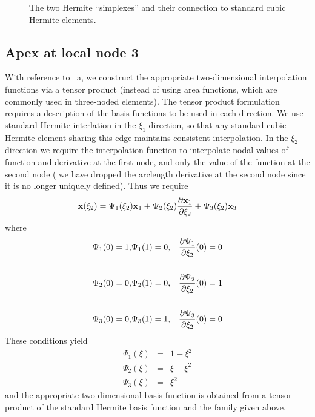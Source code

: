 \begin{figure}
\centering
 
 \caption[The two Hermite ``simplexes'']{The two Hermite ``simplexes'' and their connection to standard cubic Hermite 
elements.}
\label{fig:hermitesectors}
\end{figure}

\subsection{Apex at local node 3}
With reference to ~a, we construct the appropriate
two-dimensional interpolation functions via a tensor product (instead of using
area functions, which are commonly used in three-noded elements).  The tensor
product formulation requires a description of the basis functions to be used
in each direction.  We use standard Hermite interlation in the $\xi_{1}$
direction, so that any standard cubic Hermite element sharing this edge
maintains consistent interpolation.  In the $\xi_{2}$ direction we require the
interpolation function to interpolate nodal values of function and derivative
at the first node, and only the value of the function at the second node (\ie
we have dropped the arclength derivative at the second node since it is no
longer uniquely defined).  Thus we require
\begin{displaymath}
 {\bf x}(\xi_{2}) = \Psi_{1}(\xi_{2}){\bf x}_{1} + \Psi_{2}(\xi_{2}) 
   \dfrac{\partial {\bf x}_{1}}{\partial \xi_{2}}   + \Psi_{3}(\xi_{2}) {\bf x}_{3}
\end{displaymath}  
where   
\begin{eqnarray*}
 \Psi_{1} (0)  = 1,&\Psi_{1} (1)=0,& \dfrac{\partial \Psi_{1}}{\partial \xi_{2}}  (0) = 0\\  \\
 \Psi_{2} (0)  = 0,&\Psi_{2} (1)=0,& \dfrac{\partial \Psi_{2}}{\partial \xi_{2}} (0) = 1\\
 \\  
 \Psi_{3} (0)  = 0,&\Psi_{3} (1)=1,& \dfrac{\partial \Psi_{3}}{\partial \xi_{2}}  (0) = 0
\end{eqnarray*}  
These conditions yield
\begin{eqnarray*}
 \Psi_{1} (\xi) & = & 1 - \xi^{2}\\ 
 \Psi_{2} (\xi) & = & \xi - \xi^{2}\\ 
 \Psi_{3} (\xi) & = & \xi^{2}
\end{eqnarray*} 
and the appropriate two-dimensional basis function is obtained from a tensor
product of the standard Hermite basis function and the family given above.

